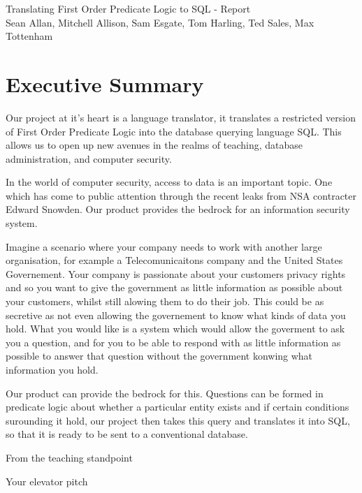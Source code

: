\documentclass[a4wide, 11pt]{article} \usepackage{a4, fullpage}
\begin{document}
\begin{center} {\huge Translating First Order Predicate Logic to SQL - Report} \\ [0.4cm]
{\large Sean Allan, Mitchell Allison, Sam Esgate, Tom Harling, Ted Sales, Max Tottenham} \\ [0.2cm]
\vspace{0cm} \end{center}


\section{Executive Summary}
Our project at it's heart is a language translator, it translates a restricted
version of First Order Predicate Logic into the database querying language
SQL. This allows us to open up new avenues in the realms of teaching, database
administration, and computer security.

In the world of computer security, access to data is an important topic. 
One which has come to public attention through the recent leaks from NSA
contracter Edward Snowden. Our product provides the bedrock for an information 
security system. 

Imagine a scenario where your company needs to work with another large organisation, 
for example a Telecomunicaitons company and the United States Governement. Your company
is passionate about your customers privacy rights and so you want to give the 
government as little information as possible about your customers, whilst still alowing
them to do their job. This could be as secretive as not even allowing the governement 
to know what kinds of data you hold. What you would like is a system which would allow
the goverment to ask you a question, and for you to be able to respond with as little 
information as possible to answer that question without the government konwing what 
information you hold. 

Our product can provide the bedrock for this. Questions can be formed in predicate 
logic about whether a particular entity exists and if certain conditions surounding 
it hold, our project then takes this query and translates it into SQL, so that it is
ready to be sent to a conventional database.

From the teaching standpoint 


        Your elevator pitch
\end{document}
